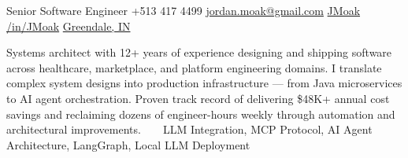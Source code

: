\documentclass[]{moak-resume}
\begin{document}
            {Senior Software Engineer}
            {\icon{\faPhone} +513 417 4499}
            {\icon{\faEnvelope[regular]} \href{mailto:jordan.moak@gmail.com}{ jordan.moak@gmail.com}}
            {\icon{\faGithub} \href{https://github.com/JMoak/}{ JMoak}}
            {\icon{\faLinkedin} \href{https://www.linkedin.com/in/jmoak/}{ /in/JMoak}}
            {\icon{\faMapMarker} \href{https://www.google.com/maps/place/Greendale,+IN+47025/@39.1487958,-84.7652822,12z/data=!4m6!3m5!1s0x8841d3fcc3d9708d:0x528857ad3dfc5551!8m2!3d39.1125572!4d-84.8641178!16zL20vMHNrdHk?entry=ttu}{ Greendale, IN}}

\begin{aside}
  \small\bodyfont Systems architect with 12+ years of experience designing and shipping software across healthcare, marketplace, and platform engineering domains. I translate complex system designs into production infrastructure — from Java microservices to AI agent orchestration. Proven track record of delivering \$48K+ annual cost savings and reclaiming dozens of engineer-hours weekly through automation and architectural improvements.
	\programmingPie{}
  ~
  ~
  \small\bodyfont LLM Integration, MCP Protocol, AI Agent Architecture, LangGraph, Local LLM Deployment
\end{aside}
~
\end{document}
